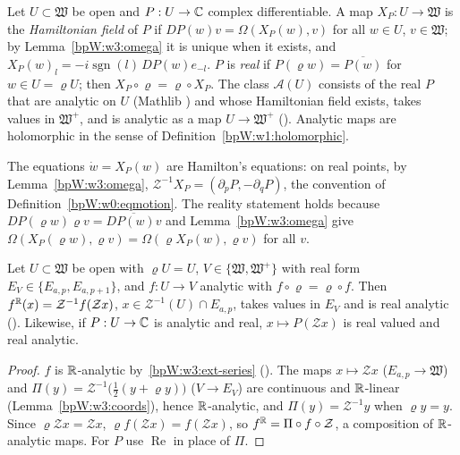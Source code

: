 \begin{definition}\label{bpW:w3:hamfield-def}
Let $U\subset\mathfrak W$ be open and $P:U\to\mathbb{C}$ complex differentiable. A map $X_P:U\to\mathfrak W$ is the
\emph{Hamiltonian field} of $P$ if $DP(w)v=\Omega(X_P(w),v)$ for all $w\in U$, $v\in\mathfrak W$; by
Lemma~\ref{bpW:w3:omega} it is unique when it exists, and $X_P(w)_l=-i\operatorname{sgn}(l)\,DP(w)e_{-l}$.
$P$ is \emph{real} if $P(\varrho w)=\overline{P(w)}$ for $w\in U=\varrho U$; then $X_P\circ\varrho=\varrho\circ X_P$.
The class $\mathcal A(U)$ consists of the real $P$ that are analytic on $U$ (Mathlib )
and whose Hamiltonian field exists, takes values in $\mathfrak W^+$, and is analytic as a map $U\to\mathfrak W^+$
(). Analytic maps are holomorphic in the sense of Definition~\ref{bpW:w1:holomorphic}.
\end{definition}

The equations $\dot w=X_P(w)$ are Hamilton's equations: on real points, by Lemma~\ref{bpW:w3:omega},
$\mathcal Z^{-1}X_P=(\partial_pP,-\partial_qP)$, the convention of Definition~\ref{bpW:w0:eqmotion}. The reality
statement holds because $DP(\varrho w)\varrho v=\overline{DP(w)v}$ and Lemma~\ref{bpW:w3:omega} give
$\Omega(X_P(\varrho w),\varrho v)=\Omega(\varrho X_P(w),\varrho v)$ for all $v$.

\begin{lemma}\label{bpW:w3:real-restrict}
Let $U\subset\mathfrak W$ be open with $\varrho U=U$, $V\in\{\mathfrak W,\mathfrak W^+\}$ with real form
$E_V\in\{E_{a,p},E_{a,p+1}\}$, and $f:U\to V$ analytic with $f\circ\varrho=\varrho\circ f$. Then
$f^{\mathbb{R}}(x)=\mathcal Z^{-1}f(\mathcal Zx)$, $x\in\mathcal Z^{-1}(U)\cap E_{a,p}$, takes values in $E_V$ and is real
analytic (). Likewise, if $P:U\to\mathbb{C}$ is analytic and real, $x\mapsto P(\mathcal Zx)$ is real
valued and real analytic.
\end{lemma}

\begin{proof}
$f$ is $\mathbb{R}$-analytic by~\ref{bpW:w3:ext-series} (). The maps
$x\mapsto\mathcal Zx$ ($E_{a,p}\to\mathfrak W$) and $\Pi(y)=\mathcal Z^{-1}\bigl(\frac12(y+\varrho y)\bigr)$
($V\to E_V$) are continuous and $\mathbb{R}$-linear (Lemma~\ref{bpW:w3:coords}), hence $\mathbb{R}$-analytic, and $\Pi(y)=\mathcal Z^{-1}y$
when $\varrho y=y$. Since $\varrho\mathcal Zx=\mathcal Zx$, $\varrho f(\mathcal Zx)=f(\mathcal Zx)$, so
$f^{\mathbb{R}}=\Pi\circ f\circ\mathcal Z$, a composition of $\mathbb{R}$-analytic maps. For $P$ use $\operatorname{Re}$ in place of
$\Pi$.
\end{proof}

